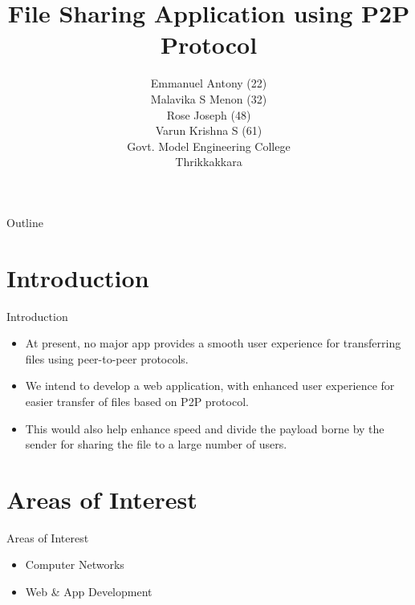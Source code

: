\documentclass[9pt]{beamer}
\begin{document}
\begin{frame}
\title {\textbf{File Sharing Application using P2P Protocol}\\
}
\author { Emmanuel Antony (22) \\
Malavika S Menon (32)\\
Rose Joseph (48) \\
Varun Krishna S (61)\\ 
\hfill \break
Govt. Model Engineering College\\
 Thrikkakkara }
\maketitle
\end{frame}

\begin{frame}[shrink]{Outline}
\tableofcontents
\end{frame}

\section{Introduction}
\begin {frame}[shrink]{Introduction}
\begin{itemize}
\item At present, no major app provides a smooth user experience for transferring files using peer-to-peer protocols. 
\item We intend to develop a web application, with enhanced user experience for easier transfer of files based on P2P protocol.
\item  This would also help enhance speed and divide the payload borne by the sender for sharing the file to a large number of users. 
\end{itemize}
\end{frame}

\section{Areas of Interest}
\begin{frame} {Areas of Interest}

\begin{itemize}
	 \item Computer Networks
     \item Web \& App Development
\end{itemize}
\end {frame}
\end{document}
